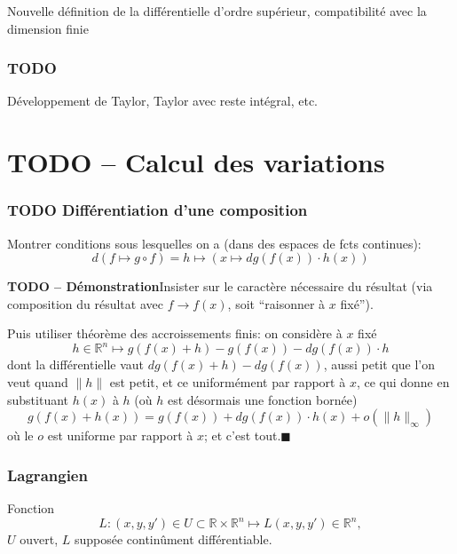 \documentclass[french,]{article}
\begin{document}
Nouvelle définition de la différentielle d'ordre supérieur,
compatibilité avec la dimension finie

\hypertarget{todo-2}{%
\subsubsection{TODO}\label{todo-2}}

Développement de Taylor, Taylor avec reste intégral, etc.

\hypertarget{todo-calcul-des-variations}{%
\section{TODO -- Calcul des
variations}\label{todo-calcul-des-variations}}

\hypertarget{todo-diffuxe9rentiation-dune-composition}{%
\subsubsection{TODO Différentiation d'une
composition}\label{todo-diffuxe9rentiation-dune-composition}}

Montrer conditions sous lesquelles on a (dans des espaces de fcts
continues): \[
d (f \mapsto g \circ f) 
=
h \mapsto (x \mapsto dg(f(x)) \cdot h(x))
\]

\vspace{3.25ex plus 1ex minus .2ex}\protect\hypertarget{todo-duxe9monstration}{}{\textbf{TODO
-- Démonstration}\quad}Insister sur le caractère nécessaire du résultat
(via composition du résultat avec \(f \to f(x)\), soit ``raisonner à
\(x\) fixé'').

Puis utiliser théorème des accroissements finis: on considère à \(x\)
fixé \[
h \in \mathbb{R}^n \mapsto g (f(x)+ h) - g(f(x)) - dg(f(x)) \cdot h
\] dont la différentielle vaut \(dg(f(x)+h) - dg(f(x))\), aussi petit
que l'on veut quand \(\|h\|\) est petit, et ce uniformément par rapport
à \(x\), ce qui donne en substituant \(h(x)\) à \(h\) (où \(h\) est
désormais une fonction bornée) \[
g (f(x)+ h(x)) = g(f(x)) + dg(f(x)) \cdot h(x) + o(\|h\|_{\infty}) 
\] où le \(o\) est uniforme par rapport à \(x\); et c'est
tout.\hfill$\blacksquare$

\hypertarget{lagrangien}{%
\subsubsection{Lagrangien}\label{lagrangien}}

Fonction \[
L: (x, y, y') \in U \subset \mathbb{R}\times \mathbb{R}^n \mapsto L(x, y, y') \in \mathbb{R}^n,
\] \(U\) ouvert, \(L\) supposée continûment différentiable.
\end{document}
